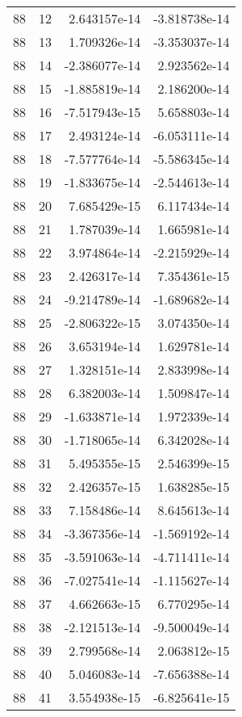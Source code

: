 \begin{tabular}{rrrr}
  88 &   12 &  2.643157e-14 & -3.818738e-14 \\
  88 &   13 &  1.709326e-14 & -3.353037e-14 \\
  88 &   14 & -2.386077e-14 &  2.923562e-14 \\
  88 &   15 & -1.885819e-14 &  2.186200e-14 \\
  88 &   16 & -7.517943e-15 &  5.658803e-14 \\
  88 &   17 &  2.493124e-14 & -6.053111e-14 \\
  88 &   18 & -7.577764e-14 & -5.586345e-14 \\
  88 &   19 & -1.833675e-14 & -2.544613e-14 \\
  88 &   20 &  7.685429e-15 &  6.117434e-14 \\
  88 &   21 &  1.787039e-14 &  1.665981e-14 \\
  88 &   22 &  3.974864e-14 & -2.215929e-14 \\
  88 &   23 &  2.426317e-14 &  7.354361e-15 \\
  88 &   24 & -9.214789e-14 & -1.689682e-14 \\
  88 &   25 & -2.806322e-15 &  3.074350e-14 \\
  88 &   26 &  3.653194e-14 &  1.629781e-14 \\
  88 &   27 &  1.328151e-14 &  2.833998e-14 \\
  88 &   28 &  6.382003e-14 &  1.509847e-14 \\
  88 &   29 & -1.633871e-14 &  1.972339e-14 \\
  88 &   30 & -1.718065e-14 &  6.342028e-14 \\
  88 &   31 &  5.495355e-15 &  2.546399e-15 \\
  88 &   32 &  2.426357e-15 &  1.638285e-15 \\
  88 &   33 &  7.158486e-14 &  8.645613e-14 \\
  88 &   34 & -3.367356e-14 & -1.569192e-14 \\
  88 &   35 & -3.591063e-14 & -4.711411e-14 \\
  88 &   36 & -7.027541e-14 & -1.115627e-14 \\
  88 &   37 &  4.662663e-15 &  6.770295e-14 \\
  88 &   38 & -2.121513e-14 & -9.500049e-14 \\
  88 &   39 &  2.799568e-14 &  2.063812e-15 \\
  88 &   40 &  5.046083e-14 & -7.656388e-14 \\
  88 &   41 &  3.554938e-15 & -6.825641e-15 \\

\end{tabular}
